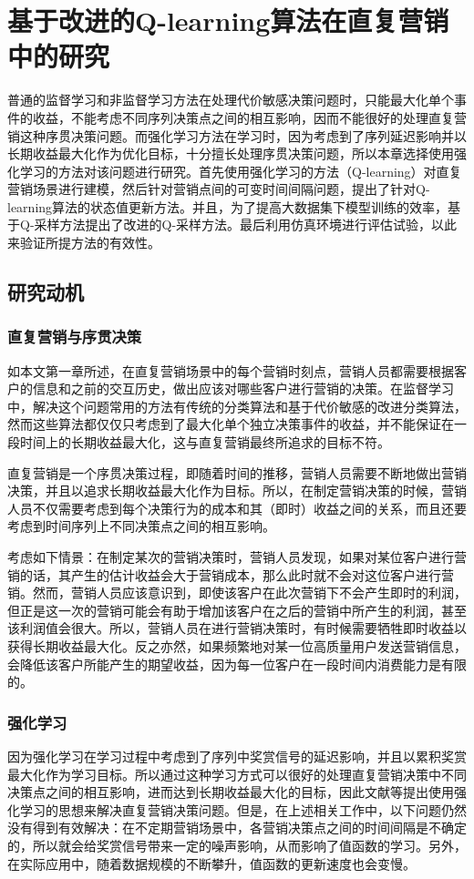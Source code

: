 
\chapter{基于改进的Q-learning算法在直复营销中的研究}
普通的监督学习和非监督学习方法在处理代价敏感决策问题时，只能最大化单个事件的收益，不能考虑不同序列决策点之间的相互影响，因而不能很好的处理直复营销这种序贯决策问题。而强化学习方法在学习时，因为考虑到了序列延迟影响并以长期收益最大化作为优化目标，十分擅长处理序贯决策问题，所以本章选择使用强化学习的方法对该问题进行研究。首先使用强化学习的方法（Q-learning）对直复营销场景进行建模，然后针对营销点间的可变时间间隔问题，提出了针对Q-learning算法的状态值更新方法。并且，为了提高大数据集下模型训练的效率，基于Q-采样方法提出了改进的Q-采样方法。最后利用仿真环境进行评估试验，以此来验证所提方法的有效性。

\section{研究动机}
\subsection{直复营销与序贯决策}
如本文第一章所述，在直复营销场景中的每个营销时刻点，营销人员都需要根据客户的信息和之前的交互历史，做出应该对哪些客户进行营销的决策。在监督学习中，解决这个问题常用的方法有传统的分类算法和基于代价敏感的改进分类算法，然而这些算法都仅仅只考虑到了最大化单个独立决策事件的收益，并不能保证在一段时间上的长期收益最大化，这与直复营销最终所追求的目标不符。

直复营销是一个序贯决策过程，即随着时间的推移，营销人员需要不断地做出营销决策，并且以追求长期收益最大化作为目标。所以，在制定营销决策的时候，营销人员不仅需要考虑到每个决策行为的成本和其（即时）收益之间的关系，而且还要考虑到时间序列上不同决策点之间的相互影响。

考虑如下情景：在制定某次的营销决策时，营销人员发现，如果对某位客户进行营销的话，其产生的估计收益会大于营销成本，那么此时就不会对这位客户进行营销。然而，营销人员应该意识到，即使该客户在此次营销下不会产生即时的利润，但正是这一次的营销可能会有助于增加该客户在之后的营销中所产生的利润，甚至该利润值会很大。所以，营销人员在进行营销决策时，有时候需要牺牲即时收益以获得长期收益最大化。反之亦然，如果频繁地对某一位高质量用户发送营销信息，会降低该客户所能产生的期望收益，因为每一位客户在一段时间内消费能力是有限的。

\subsection{强化学习}
因为强化学习在学习过程中考虑到了序列中奖赏信号的延迟影响，并且以累积奖赏最大化作为学习目标。所以通过这种学习方式可以很好的处理直复营销决策中不同决策点之间的相互影响，进而达到长期收益最大化的目标，因此文献\citep{pednault2002sequential,archak2010budget,boutilier2016budget}等提出使用强化学习的思想来解决直复营销决策问题。但是，在上述相关工作中，以下问题仍然没有得到有效解决：在不定期营销场景中，各营销决策点之间的时间间隔是不确定的，所以就会给奖赏信号带来一定的噪声影响，从而影响了值函数的学习。另外，在实际应用中，随着数据规模的不断攀升，值函数的更新速度也会变慢。

